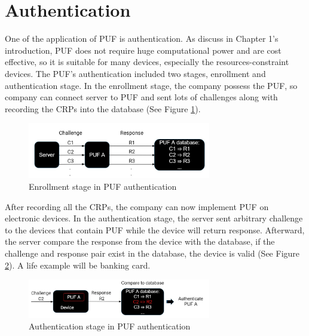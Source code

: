 \section{Authentication}
One of the application of PUF is authentication. As discuss in Chapter 1's introduction, PUF does not require huge computational power and are cost effective, so it is suitable for many devices,
especially the resources-constraint devices. The PUF's authentication included two stages, enrollment and authentication stage. In the enrollment stage, the company possess the PUF, so
company can connect server to PUF and sent lots of challenges along with recording the CRPs into the database \cite{Reference2} (See Figure \ref{fig:figure4}).

\begin{figure}[htp]
    \centering
    \includegraphics[width=8cm]{figures/figure4.jpg}
    \caption{Enrollment stage in PUF authentication}
    \label{fig:figure4}
    \end{figure}

After recording all the CRPs, the company can now implement PUF on electronic devices.
In the authentication stage, the server sent arbitrary challenge to the devices that contain PUF while the device will return response. Afterward, the server compare the response from the device with the database, 
if the challenge and response pair exist in the database, the device is valid \cite{Reference2} (See Figure \ref{fig:figure5}). A life example will be banking card.

\begin{figure}[htp]
    \centering
    \includegraphics[width=8cm]{figures/figure5.jpg}
    \caption{Authentication stage in PUF authentication}
    \label{fig:figure5}
    \end{figure}

